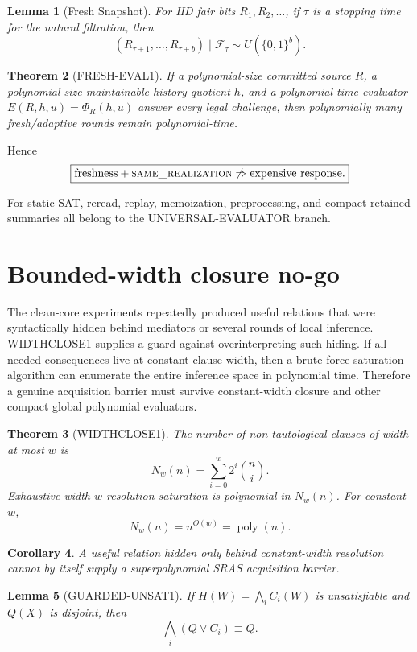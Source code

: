 \documentclass[11pt]{article}
\newcommand{\same}{\textsc{same\_realization}}
\newcommand{\poly}{\operatorname{poly}}
\theoremstyle{plain}
\newtheorem{theorem}{Theorem}[section]
\newtheorem{lemma}[theorem]{Lemma}
\newtheorem{corollary}[theorem]{Corollary}
\theoremstyle{definition}
\theoremstyle{remark}
\begin{document}
\begin{lemma}[Fresh Snapshot]
For IID fair bits $R_1,R_2,\dots$, if $\tau$ is a stopping time for the natural
filtration, then
\[
(R_{\tau+1},\dots,R_{\tau+b})\mid\mathcal F_\tau
\sim U(\{0,1\}^b).
\]
\end{lemma}

\begin{theorem}[FRESH-EVAL1]
If a polynomial-size committed source $R$, a polynomial-size maintainable
history quotient $h$, and a polynomial-time evaluator
$E(R,h,u)=\Phi_R(h,u)$ answer every legal challenge, then polynomially many
fresh/adaptive rounds remain polynomial-time.
\end{theorem}

Hence
\[
\boxed{\text{freshness}+\same\not\Rightarrow\text{expensive response}.}
\]

For static SAT, reread, replay, memoization, preprocessing, and compact
retained summaries all belong to the UNIVERSAL-EVALUATOR branch.

\section{Bounded-width closure no-go}

The clean-core experiments repeatedly produced useful relations that were
syntactically hidden behind mediators or several rounds of local inference.
WIDTHCLOSE1 supplies a guard against overinterpreting such hiding. If all
needed consequences live at constant clause width, then a brute-force
saturation algorithm can enumerate the entire inference space in polynomial
time. Therefore a genuine acquisition barrier must survive constant-width
closure and other compact global polynomial evaluators.

\begin{theorem}[WIDTHCLOSE1]
The number of non-tautological clauses of width at most $w$ is
\[
\boxed{
N_w(n)=\sum_{i=0}^{w}2^i\binom ni.
}
\]
Exhaustive width-$w$ resolution saturation is polynomial in $N_w(n)$. For
constant $w$,
\[
\boxed{N_w(n)=n^{O(w)}=\poly(n).}
\]
\end{theorem}

\begin{corollary}
A useful relation hidden only behind constant-width resolution cannot by
itself supply a superpolynomial SRAS acquisition barrier.
\end{corollary}

\begin{lemma}[GUARDED-UNSAT1]
If $H(W)=\bigwedge_i C_i(W)$ is unsatisfiable and $Q(X)$ is disjoint, then
\[
\boxed{
\bigwedge_i(Q\vee C_i)\equiv Q.
}
\]
\end{lemma}
\end{document}
